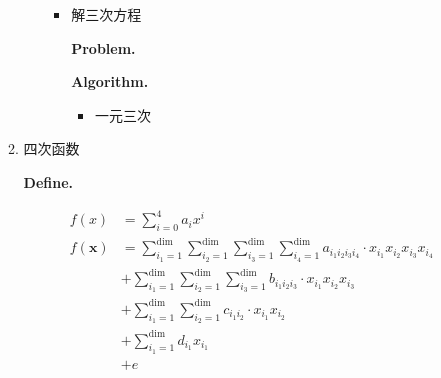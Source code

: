 \documentclass{article}
\begin{document}
\begin{enumerate}
\begin{enumerate}
\begin{enumerate}
					\begin{itemize}
					\item 解三次方程\par
						\textbf{Problem. }\par
						\textbf{Algorithm. }\par
							\begin{itemize}
							\item 一元三次\par
							\end{itemize}
					\end{itemize}
				\end{enumerate}\par
		\item 四次函数\par
			\textbf{Define. }\par
				\begin{align*}
f\left(x\right) &= \sum\limits_{i=0}^{4} a_i x^i  \tag{一元}\\
f\left(\boldsymbol x\right) &= \sum\limits_{i_1=1}^{\dim} \sum\limits_{i_2=1}^{\dim} \sum\limits_{i_3=1}^{\dim} \sum\limits_{i_4=1}^{\dim} a_{i_1 i_2 i_3 i_4} · x_{i_1} x_{i_2} x_{i_3} x_{i_4} \\
&+ \sum\limits_{i_1=1}^{\dim} \sum\limits_{i_2=1}^{\dim} \sum\limits_{i_3=1}^{\dim} b_{i_1 i_2 i_3} · x_{i_1} x_{i_2} x_{i_3} \\
&+ \sum\limits_{i_1=1}^{\dim} \sum\limits_{i_2=1}^{\dim} c_{i_1 i_2} · x_{i_1} x_{i_2} \\
&+ \sum\limits_{i_1=1}^{\dim} d_{i_1} x_{i_1} \\
&+ e  \tag{多元, 分量式}
\end{align*}


\end{enumerate}
\end{enumerate}
\end{document}
